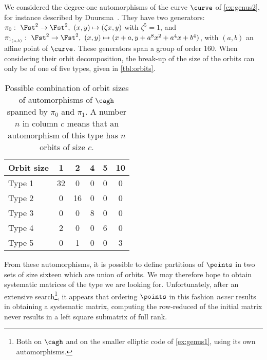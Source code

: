 We considered the degree-one automorphisms of the curve $\curve$ of \autoref{ex:genus2}, for instance described
by Duursma~\cite{duursma}. They have two generators: $\pi_0:~\Fst^2 \rightarrow \Fst^2,~(x, y) \mapsto (\zeta x, y)$ with $\zeta^5 = 1$, and
$\pi_{1_{(a,b)}}:~\Fst^2 \rightarrow \Fst^2,~(x, y) \mapsto (x + a, y + a^8 x^2 + a^4 x + b^4)$, with $(a, b)$ an affine point of $\curve$.
These generators span a group of order 160.
When considering their orbit decomposition, the break-up of the size of the orbits can only be of one of five types, given
in \autoref{tbl:orbits}.

\begin{table}[!h]
\caption[Possible combination of orbit sizes of automorphisms of $\cagh$ spanned by $\pi_0$ and $\pi_1$.]{Possible combination of orbit sizes of automorphisms of $\cagh$ spanned by $\pi_0$ and $\pi_1$.
A number $n$ in column $c$ means that an automorphism of this type has $n$ orbits of size $c$.
\label{tbl:orbits}}
\begin{center}
\begin{tabular}{ l  c  c  c  c  c}
\toprule
 Orbit size & 1 & 2 & 4 & 5 & 10 \\
\midrule
Type 1 & 32 & 0 & 0 & 0 & 0\\

Type 2 & 0 & 16 & 0 & 0 & 0\\

Type 3 & 0 & 0 & 8 & 0 & 0\\

Type 4 & 2 & 0 & 0 & 6 & 0\\

Type 5 & 0 & 1 & 0 & 0 & 3\\
\bottomrule
\end{tabular}
\end{center}
\end{table}
\noindent
From these automorphisms, it is possible to define partitions of $\points$ in two sets of size sixteen which are union of orbits. We may therefore
hope to obtain systematic matrices of the type we are looking for. Unfortunately, after an extensive search\footnote{Both on $\cagh$ and
on the smaller elliptic code of \autoref{ex:genus1}, using its own automorphisms.}, it appears that ordering $\points$ in this fashion \emph{never} results in
obtaining a systematic matrix, \ie computing the row-reduced of the initial matrix never results in a left square submatrix of full rank.

